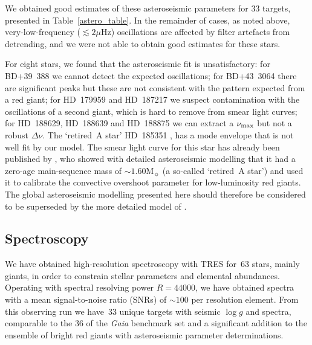 \documentclass[a4paper,fleqn,usenatbib]{mnras}
\newcommand{\numax}{\mbox{$\nu_{\rm max}$}\xspace}
\newcommand{\Dnu}{\mbox{$\Delta \nu$}\xspace}
\newcommand{\muHz}{\mbox{$\mu$Hz}\xspace}
\newcommand{\logg}{\mbox{$\log g$}\xspace}
\newcommand{\msun}{\mbox{$\mathrm{M}_{\sun}$}\xspace}
\newcommand{\gaia}{\textit{Gaia}\xspace}
\begin{document}
We obtained good estimates of these asteroseismic parameters for 33 targets, presented in Table~\ref{astero_table}. In the remainder of cases, as noted above, very-low-frequency ($\lesssim 2\muHz$) oscillations are affected by filter artefacts from detrending, and we were not able to obtain good estimates for these stars. 

For eight stars, we found that the asteroseismic fit is unsatisfactory: for BD+39~388 we cannot detect the expected oscillations; for BD+43~3064 there are significant peaks but these are not consistent with the pattern expected from a red giant; for HD~179959 and HD~187217 we suspect contamination with the oscillations of a second giant, which is hard to remove from smear light curves; for HD~188629, HD~188639 and HD~188875 we can extract a \numax but not a robust \Dnu. The `retired~A star' HD~185351 \citep[studied by][]{2014ApJ...794...15J}, has a mode envelope that is not well fit by our model. The smear light curve for this star has already been published by \citet{2017MNRAS.464.3713H}, who showed with detailed asteroseismic modelling that it had a zero-age main-sequence mass of $\sim 1.60 \msun$ (a so-called `retired~A star') and used it to calibrate the convective overshoot parameter for low-luminosity red giants. The global asteroseismic modelling presented here should therefore be considered to be superseded by the more detailed model of \citet{2017MNRAS.464.3713H}. 



\subsection{Spectroscopy}
\label{spectroscopy}

We have obtained high-resolution spectroscopy with TRES for~63 stars, mainly giants, in order to constrain stellar parameters and elemental abundances. Operating with spectral resolving power $R=44 000$, we have obtained spectra with a mean signal-to-noise ratio (SNRs) of $\sim 100$  per resolution element. %
From this observing run we have~33 unique targets with seismic \logg and spectra, comparable to the 36 of the \gaia benchmark set \citep{2018RNAAS...2c.152J} and a significant addition to the ensemble of bright red giants with asteroseismic parameter determinations. %
\end{document}
